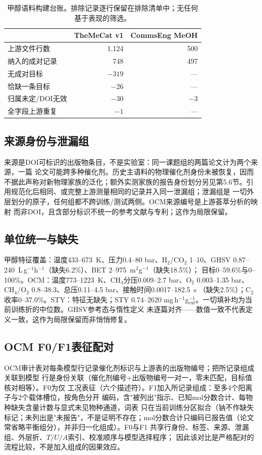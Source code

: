 \documentclass[11pt,a4paper]{article}
\begin{document}
\begin{table}[t]
\centering\small
\caption{甲醇语料构建台账。排除记录逐行保留在排除清单中；无任何基于表现的筛选。}
\label{tab:ledger}
\begin{tabular}{lrr}
\toprule
 & TheMeCat v1 & CommsEng MeOH \\
\midrule
上游文件行数 & 1{,}124 & 500 \\
纳入的成对记录 & 748 & 497 \\
无成对目标 & $-319$ & --- \\
恰缺一条目标 & $-26$ & --- \\
归属未定/DOI无效 & $-30$ & $-3$ \\
全字段上游重复 & $-1$ & --- \\
\bottomrule
\end{tabular}
\end{table}

\subsection{来源身份与泄漏组}
来源是DOI可标识的出版物条目，不是实验室：同一课题组的两篇论文计为两个来源，一篇
论文可能跨多种催化剂。历史主语料的物理催化剂身份未被恢复，因而不据此声称对新物理家族的泛化；额外实测家族的报告身份划分另见第5.6节。引用规范化后相同、或完整上游测量相同的记录并入同一泄漏组；泄漏组是
一切外层划分的原子，任何组都不跨训练/测试两侧。OCM来源编号是上游荟萃分析的映射
而非DOI，且含部分标识不统一的参考文献与专利；这作为局限保留。

\subsection{单位统一与缺失}
甲醇特征覆盖：温度433--673~K、压力0.4--80 bar、H$_2$/CO$_2$ 1--10、GHSV
0.87--240~L\,g$^{-1}$h$^{-1}$（缺失6.2\%）、BET 2--975~m$^2$g$^{-1}$（缺失18.5\%）；
目标0--59.6\%与0--100\%。OCM：温度773--1223~K、CH$_4$分压0.009--2.7 bar、O$_2$
0.003--1.35 bar、CH$_4$/O$_2$ 0.8--38.3、总压0.11--4.5 bar、接触时间0.0017--182.5~s
（缺失2.5\%）；C$_2$收率0--37.0\%。STY：特征无缺失；STY 0.74--2620
mg\,h$^{-1}$g$_{cat}^{-1}$。一切填补均为当前训练折的中位数。GHSV参考态与惰性定义
未逐篇对齐——数值一致不代表定义一致，这作为局限保留而非悄悄修复。

\subsection{OCM F0/F1表征配对}
OCM审计表对每条模型行记录催化剂标识与上游表的出版物编号；把所记录组成关联到模型
行是身份关联（催化剂编号+出版物编号一对一，零未匹配，目标值核对相等）。F0为仅
工况表征（六个描述符）。F1加入所记录组成：至多4个阳离子与2个载体槽位，按角色分开
编码，含"被列出"指示、已知mol分数合计、每物种缺失含量计数与显式未见物种通道，词表
只在当前训练分区拟合（钠不作缺失标记；未列出是"未报告"，不是证明不存在；mol分数合计只编码已报告值（论文常省略平衡组分），并非归一化组成）。F0与F1
共享行身份、标签、来源、泄漏组、外层折、$T/U/A$索引、校准顺序与模型选择程序；
因此该对比是严格配对的流程比较，不是加入组成的因果效应。
\end{document}
